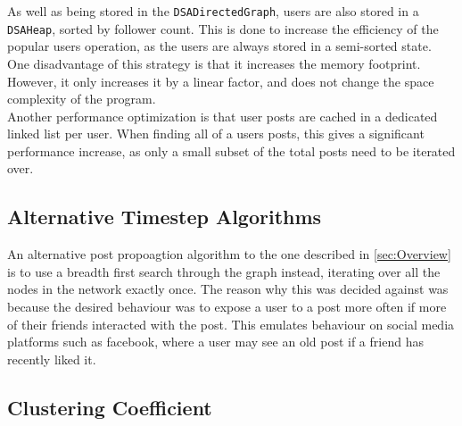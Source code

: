 \documentclass{article}
\begin{document}
As well as being stored in the \texttt{DSADirectedGraph}, users are also stored in a \texttt{DSAHeap},
sorted by follower count. This is done to increase the efficiency of the popular users operation,
as the users are always stored in a semi-sorted state.
One disadvantage of this strategy is that it increases the memory footprint. However, it only increases it
by a linear factor, and does not change the space complexity of the program.\\

Another performance optimization is that user posts are cached in a dedicated linked list per user.
When finding all of a users posts, this gives a significant performance increase,
as only a small subset of the total posts need to be iterated over.\\

\subsection{Alternative Timestep Algorithms}

An alternative post propoagtion algorithm to the one described in \autoref{sec:Overview}
is to use a breadth first search through the graph instead,
iterating over all the nodes in the network exactly once. The reason why this was decided against was because
the desired behaviour was to expose a user to a post more often if more of their friends interacted with the post.
This emulates behaviour on social media
platforms such as facebook, where a user may see an old post if a friend has recently liked it.\\

\subsection{Clustering Coefficient}
\end{document}
